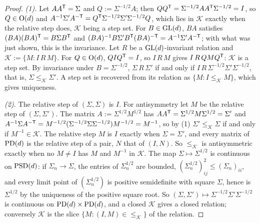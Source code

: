\begin{proof}
\leanok
\emph{(1).} Let $AA^{\mathsf{T}} = \Sigma$ and $Q := \Sigma^{-1/2}A$; then $QQ^{\mathsf{T}} =
\Sigma^{-1/2}AA^{\mathsf{T}}\Sigma^{-1/2} = I$, so $Q \in \mathrm{O}(d)$ and $A^{-1}\Sigma'A^{-\mathsf{T}} =
Q^{\mathsf{T}}\Sigma^{-1/2}\Sigma'\Sigma^{-1/2}Q$, which lies in $\mathcal K$ exactly when the relative step does,
$\mathcal K$ being a step set. For $B \in \mathrm{GL}(d)$, $BA$ satisfies $(BA)(BA)^{\mathsf{T}} = B\Sigma B^{\mathsf{T}}$ and
$(BA)^{-1}B\Sigma'B^{\mathsf{T}}(BA)^{-\mathsf{T}} = A^{-1}\Sigma'A^{-\mathsf{T}}$; with what was just shown, this is the
invariance. Let $R$ be a $\mathrm{GL}(d)$-invariant relation and $\mathcal K := \{M : I \,R\,M\}$. For
$Q \in \mathrm{O}(d)$, $QIQ^{\mathsf{T}} = I$, so $I \,R\,M$ gives $I \,R\,QMQ^{\mathsf{T}}$: $\mathcal K$ is a
step set. By invariance under $B = \Sigma^{-1/2}$, $\Sigma \,R\,\Sigma'$ if and only if
$I \,R\,\Sigma^{-1/2}\Sigma'\Sigma^{-1/2}$, that is, $\Sigma \le_{\mathcal K} \Sigma'$. A step set
is recovered from its relation as $\{M : I \le_{\mathcal K} M\}$, which gives uniqueness.

\emph{(2).} The relative step of $(\Sigma, \Sigma)$ is $I$. For antisymmetry let $M$ be the relative step
of $(\Sigma, \Sigma')$. The matrix $A := \Sigma^{1/2}M^{1/2}$ has $AA^{\mathsf{T}} = \Sigma^{1/2}M\Sigma^{1/2} =
\Sigma'$ and $A^{-1}\Sigma A^{-\mathsf{T}} = M^{-1/2}(\Sigma^{-1/2}\Sigma\Sigma^{-1/2})M^{-1/2} = M^{-1}$, so by
(1) $\Sigma' \le_{\mathcal K} \Sigma$ if and only if $M^{-1} \in \mathcal K$. The
relative step $M$ is $I$ exactly when $\Sigma = \Sigma'$, and every matrix of $\mathrm{PD}(d)$ is the relative step
of a pair, $N$ that of $(I, N)$. So $\le_{\mathcal K}$ is antisymmetric exactly when no $M \ne I$ has $M$
and $M^{-1}$ in $\mathcal K$. The map $\Sigma \mapsto \Sigma^{1/2}$ is continuous on $\mathrm{PSD}(d)$: if
$\Sigma_n \to \Sigma$, the entries of $\Sigma_n^{1/2}$ are bounded, $(\Sigma_n^{1/2})_{ij}^2 \le
(\Sigma_n)_{ii}$, and every limit point of $(\Sigma_n^{1/2})$ is positive semidefinite with square
$\Sigma$, hence is $\Sigma^{1/2}$ by the uniqueness of the positive square root. So
$(\Sigma, \Sigma') \mapsto \Sigma^{-1/2}\Sigma'\Sigma^{-1/2}$ is continuous on $\mathrm{PD}(d) \times \mathrm{PD}(d)$, and a closed
$\mathcal K$ gives a closed relation; conversely $\mathcal K$ is the slice $\{M : (I, M) \in {\le_{\mathcal K}}\}$
of the relation.


\end{proof}
